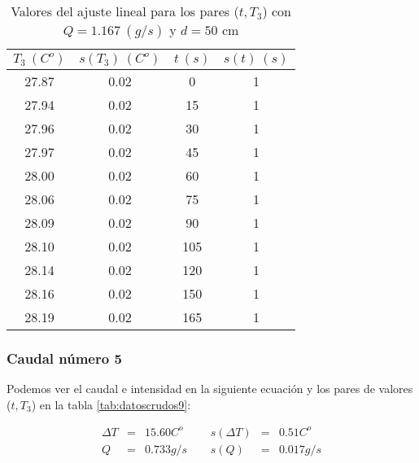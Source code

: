 \documentclass[12pt,a4paper]{article}
\begin{document}
 \begin{table}[h!] 	 \centering 
\begin{tabular}{|c|c|c|c|} 
\hline 
$T_3 \ (C^o)$ & $s(T_3) \ (C^o)$ & $ t \ (s)$ & $s(t) \ (s)$  \\ \hline 
27.87  & 0.02 &  0 & 1 \\ 
\hline
27.94  & 0.02 &  15 & 1 \\ 
\hline
27.96  & 0.02 &  30 & 1 \\ 
\hline
27.97  & 0.02 &  45 & 1 \\ 
\hline
28.00  & 0.02 &  60 & 1 \\ 
\hline
28.06  & 0.02 &  75 & 1 \\ 
\hline
28.09  & 0.02 &  90 & 1 \\ 
\hline
28.10  & 0.02 &  105 & 1 \\ 
\hline
28.14  & 0.02 &  120 & 1 \\ 
\hline
28.16  & 0.02 &  150 & 1 \\ 
\hline
28.19  & 0.02 &  165 & 1 \\ 
\hline
\end{tabular} 
\caption{Valores del ajuste lineal para los pares ($t,T_3$) con $Q=1.167 \ (g/s)$ y $d= 50 $ cm} 
\label{tab:datoscrudos8} 
\end{table} 
 
 \newpage
 
\subsubsection{Caudal número 5} \label{subsec:10} 
 
Podemos ver el caudal e intensidad en la siguiente ecuación y los pares de valores ($t,T_3$) en la tabla \ref{tab:datoscrudos9}: 
 
\begin{equation} 
\begin{array}{lllllll}
\Delta T & = & 15.60 C^o &  \ \ &  s(\Delta T) & =  & 0.51  C^o \\ 
 Q & = & 0.733 g/s &  \ \ &  s(Q) & =  & 0.017  g/s \\ 
 \end{array} 
\end{equation} 
 
\end{document}
